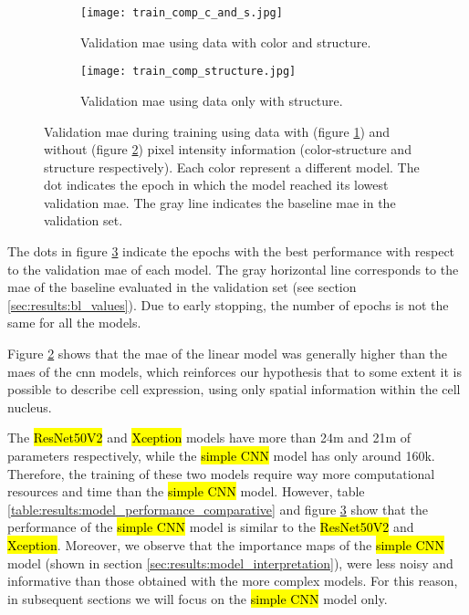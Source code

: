 \begin{figure}[!ht]
  \centering
  \begin{subfigure}[b]{.9\linewidth}
    \texttt{[image: train\_comp\_c\_and\_s.jpg]}
    \caption{Validation \gls{mae} using data with color and structure.}
    \label{fig:results:train_per_com:cs}
  \end{subfigure}%
  \vspace{3mm}
  \begin{subfigure}[b]{.9\linewidth}
    \texttt{[image: train\_comp\_structure.jpg]}
    \caption{Validation \gls{mae} using data only with structure.}
    \label{fig:results:train_per_com:s}
  \end{subfigure}
  \caption{Validation \gls{mae} during training using data with (figure \ref{fig:results:train_per_com:cs}) and without (figure \ref{fig:results:train_per_com:s}) pixel intensity information (color-structure and structure respectively). Each color represent a different model. The dot indicates the epoch in which the model reached its lowest validation \gls{mae}. The gray line indicates the baseline \gls{mae} in the validation set.}
  \label{fig:results:train_per_com}
\end{figure}

The dots in figure \ref{fig:results:train_per_com} indicate the epochs with the best performance with respect to the validation \gls{mae} of each model.
The gray horizontal line corresponds to the \gls{mae} of the baseline evaluated in the validation set (see section \ref{sec:results:bl_values}). Due to early stopping, the number of epochs is not the same for all the models.

Figure \ref{fig:results:train_per_com:s} shows that the \gls{mae} of the linear model was generally higher than the \glspl{mae} of the \gls{cnn} models, which reinforces our hypothesis that to some extent it is possible to describe cell expression, using only spatial information within the cell nucleus.

The \hl{ResNet50V2} and \hl{Xception} models have more than 24m and 21m of parameters respectively, while the \hl{simple CNN} model has only around 160k. Therefore, the training of these two models require way more computational resources and time than the \hl{simple CNN} model.
However, table \ref{table:results:model_performance_comparative} and figure \ref{fig:results:train_per_com} show that the performance of the \hl{simple CNN} model is similar to the \hl{ResNet50V2} and \hl{Xception}.
Moreover, we observe that the importance maps of the \hl{simple CNN} model (shown in section \ref{sec:results:model_interpretation}), were less noisy and informative than those obtained with the more complex models. For this reason, in subsequent sections we will focus on the \hl{simple CNN} model only.
